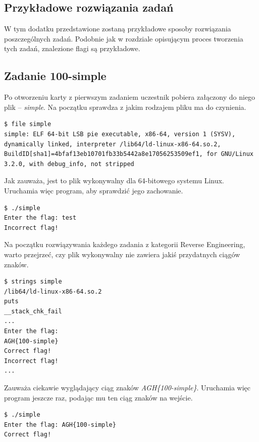 \documentclass[language=polish,type=eng]{aghmodern}
\begin{document}
\begin{appendices}
\chapter{Przykładowe rozwiązania zadań}
\label{chap:writeups}

W tym dodatku przedstawione zostaną przykładowe sposoby rozwiązania poszczególnych zadań.
Podobnie jak w rozdziale opisującym proces tworzenia tych zadań, znalezione
flagi są przykładowe.

\section{Zadanie 100-simple}

Po otworzeniu karty z pierwszym zadaniem uczestnik pobiera załączony do niego
plik -- \emph{simple}.
Na początku sprawdza z jakim rodzajem pliku ma do czynienia.

\begin{verbatim}
$ file simple
simple: ELF 64-bit LSB pie executable, x86-64, version 1 (SYSV), dynamically linked, interpreter /lib64/ld-linux-x86-64.so.2, BuildID[sha1]=4bfaf13eb10701fb33b5442a8e17056253509ef1, for GNU/Linux 3.2.0, with debug_info, not stripped
\end{verbatim}

Jak zauważa, jest to plik wykonywalny dla 64-bitowego systemu Linux.
Uruchamia więc program, aby sprawdzić jego zachowanie.

\begin{verbatim}
$ ./simple
Enter the flag: test
Incorrect flag!
\end{verbatim}

Na początku rozwiązywania każdego zadania z kategorii Reverse Engineering, warto
przejrzeć, czy plik wykonywalny nie zawiera jakiś przydatnych ciągów znaków.

\begin{verbatim}
$ strings simple
/lib64/ld-linux-x86-64.so.2
puts
__stack_chk_fail
...
Enter the flag: 
AGH{100-simple}
Correct flag!
Incorrect flag!
...
\end{verbatim}

Zauważa ciekawie wyglądający ciąg znaków \emph{AGH\{100-simple\}}.
Uruchamia więc program jeszcze raz, podając mu ten ciąg znaków na wejście.

\begin{verbatim}
$ ./simple
Enter the flag: AGH{100-simple}
Correct flag!
\end{verbatim}


\end{appendices}
\end{document}
